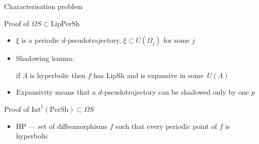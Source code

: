 \documentclass{beamer}
\begin{document}
\begin{section}{Characterisation problem}
\begin{frame}{Proof of $\Omega S\subset\mbox{LipPerSh}$}
\begin{itemize}
	$\Omega(f)=\Omega_1\cup\ldots\cup\Omega_m$, $\Omega_j$ is hyperbolic and has a dense semi-trajectory
  \item $\xi$ is a periodic $d$-pseudotrajectory, $\xi\subset U(\Omega_j)$ for some $j$ 
	\item Shadowing lemma: 
	
	if $\Lambda$ is hyperbolic then $f$ has LipSh and is expansive in some~$U(\Lambda)$
	\item Expansivity means that a $d$-pseudotrajectory can be shadowed only by one $p$ 
\end{itemize}
\end{frame}
\begin{frame}{Proof of $\mbox{Int}^1(\mbox{PerSh})\subset\Omega S$}
\begin{itemize}
	\item HP --- set of diffeomorphisms $f$ such that every periodic point of $f$ is hyperbolic
	

\end{itemize}
\end{frame}
\end{section}
\end{document}
